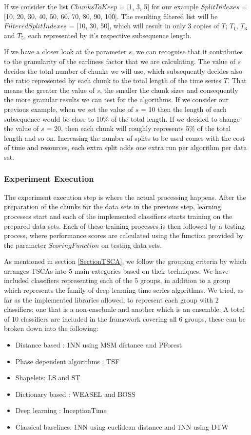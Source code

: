 If we consider the list $ChunksToKeep$ = [1, 3, 5] for our example $SplitIndexes$ = [10, 20, 30, 40, 50, 60, 70, 80, 90, 100].
The resulting filtered list will be $FilteredSplitIndexes$ = [10, 30, 50], which will result in only 3 copies of $T$; $T_{1}$, $T_{3}$ and $T_{5}$,
each represented by it's respective subsequence length.

If we have a closer look at the parameter $s$, we can recognise that it contributes to the granularity of the earliness factor that we are calculating.
The value of $s$ decides the total number of chunks we will use, which subsequently decides also the ratio represented by each chunk to the total length of the time series $T$.
That means the greater the value of $s$, the smaller the chunk sizes and consequently the more granular results we can test for the algorithms.
If we consider our previous example, when we set the value of $s$ = 10 then the length of each subsequence would be close to 10\% of the total length.
If we decided to change the value of $s$ = 20, then each chunk will roughly represents 5\% of the total length and so on.
Increasing the number of splits to be used comes with the cost of time and resources, each extra split adds one extra run per algorithm per data set.

\subsubsection{Experiment Execution}
\label{SubsectionExperimentExecution}
The experiment execution step is where the actual processing happens.
After the preparation of the chunks for the data sets in the previous step, learning processes start and each of the implemented classifiers starts training on the prepared data sets.
Each of these training processes is then followed by a testing process, where performance scores are calculated using the function provided by the parameter $ScoringFunction$ on testing data sets.

As mentioned in section \ref{SectionTSCA}, we follow the grouping criteria by \cite{bagnall2017great} which arranges TSCAs into 5 main categories based on their techniques.
We have included classifiers representing each of the 5 groups, in addition to a  group which represents the family of deep learning time series algorithms.
We tried, as far as the implemented libraries allowed, to represent each group with 2 classifiers; one that is a non-ensebmle and another which is an ensemble.
A total of 10 classifiers are included in the framework covering all 6 groups, these can be broken down into the following:
\begin{itemize}
  \item Distance based : 1NN using MSM distance and PForest
  \item Phase dependent algorithms : TSF
  \item Shapelets: LS and ST
  \item Dictionary based : WEASEL and BOSS
  \item Deep learning : InceptionTime
  \item Classical baselines: 1NN using euclidean distance and 1NN using DTW
\end{itemize}

